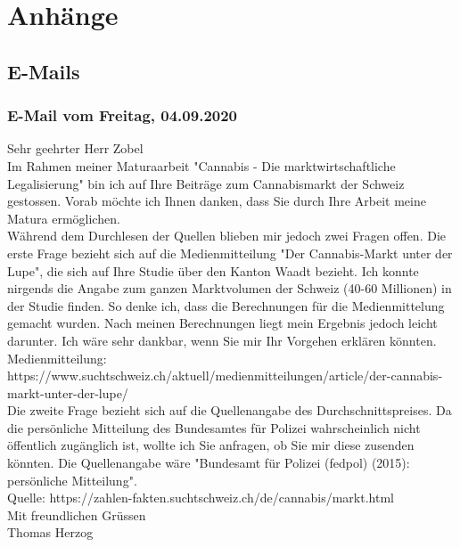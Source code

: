 \documentclass[../main.tex]{subfiles}
\begin{document}
	\section{Anhänge}
	
	\subsection{E-Mails}
	
	\subsubsection{E-Mail vom Freitag, 04.09.2020}
	
	\begin{tcolorbox}[title=Thomas Herzog to Frank Zobel]
		Sehr geehrter Herr Zobel\\

		Im Rahmen meiner Maturaarbeit "Cannabis - Die marktwirtschaftliche Legalisierung" bin ich auf Ihre Beiträge zum Cannabismarkt der Schweiz gestossen. Vorab möchte ich Ihnen danken, dass Sie durch Ihre Arbeit meine Matura ermöglichen.\\

		Während dem Durchlesen der Quellen blieben mir jedoch zwei Fragen offen. Die erste Frage bezieht sich auf die Medienmitteilung "Der Cannabis-Markt unter der Lupe", die sich auf Ihre Studie über den Kanton Waadt bezieht. Ich konnte nirgends die Angabe zum ganzen Marktvolumen der Schweiz (40-60 Millionen) in der Studie finden. So denke ich, dass die Berechnungen für die Medienmittelung gemacht wurden. Nach meinen Berechnungen liegt mein Ergebnis jedoch leicht darunter. Ich wäre sehr dankbar, wenn Sie mir Ihr Vorgehen erklären könnten.\\

		Medienmitteilung: \\
		https://www.suchtschweiz.ch/aktuell/medienmitteilungen/article/der-cannabis-markt-unter-der-lupe/\\

		Die zweite Frage bezieht sich auf die Quellenangabe des Durchschnittspreises. Da die persönliche Mitteilung des Bundesamtes für Polizei wahrscheinlich nicht öffentlich zugänglich ist, wollte ich Sie anfragen, ob Sie mir diese zusenden könnten. Die Quellenangabe wäre "Bundesamt für Polizei (fedpol) (2015): persönliche Mitteilung".\\

		Quelle:	https://zahlen-fakten.suchtschweiz.ch/de/cannabis/markt.html\\


		Mit freundlichen Grüssen\\
		Thomas Herzog
	\end{tcolorbox}
	
\end{document}

